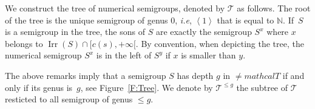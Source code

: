 \documentclass[reqno,11pt]{amsart}
\theoremstyle{plain}
\theoremstyle{definition}
\newcommand{\gr}[1]{{\color{gray} #1}}
\newcommand{\ie}{\emph{i.e.}}
\renewcommand{\leq}{\leqslant}
\newcommand{\NN}{\mathbb{N}}
\newcommand{\sgnode}[1]{{\bf \left<#1\right>}}
\renewcommand{\ie}{\emph{i.e}}
\DeclareMathOperator{\Irr}{Irr}
\begin{document}
We construct the tree of numerical semigroups, denoted by $\mathcal{T}$ as follows. 
The root of the tree is the unique semigroup of genus $0$, \ie, $\left<1\right>$ that is equal to $\NN$. 
If~$S$ is a semigroup in the tree,  the sons of $S$ are exactly the semigroup $S^x$ where $x$ belongs to $\Irr(S)\cap[c(s),+\infty[$. 
By convention, when depicting the tree, the numerical semigroup $S^x$ is in the left of $S^y$ if $x$ is smaller than $y$. 

The above remarks imply that a semigroup $S$ has depth $g$ in $≠mathcal{T}$ if and only if its genus is~$g$, see Figure~\ref{F:Tree}.
We denote by $\mathcal{T}^{\leq g}$ the subtree of $\mathcal{T}$ resticted to all semigroup of genus $\leq g$.


 \begin{figure}[htf!]


\end{figure}
\end{document}
